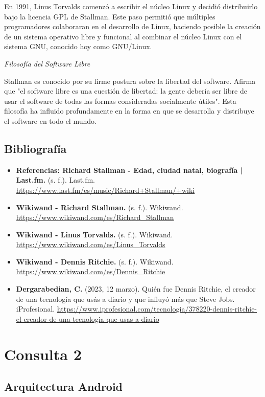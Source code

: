 \documentclass[11pt,twoside]{book}
\begin{document}
En 1991, Linus Torvalds comenzó a escribir el núcleo Linux y decidió distribuirlo bajo la licencia GPL de Stallman. Este paso permitió que múltiples programadores colaboraran en el desarrollo de Linux, haciendo posible la creación de un sistema operativo libre y funcional al combinar el núcleo Linux con el sistema GNU, conocido hoy como GNU/Linux.

\textit{Filosofía del Software Libre}

Stallman es conocido por su firme postura sobre la libertad del software. Afirma que "el software libre es una cuestión de libertad: la gente debería ser libre de usar el software de todas las formas consideradas socialmente útiles". Esta filosofía ha influido profundamente en la forma en que se desarrolla y distribuye el software en todo el mundo.

\subsection*{Bibliografía}
\begin{itemize}
  \item \textbf{Referencias: Richard Stallman - Edad, ciudad natal, biografía | Last.fm.} (s. f.). Last.fm. \url{https://www.last.fm/es/music/Richard+Stallman/+wiki}

  \item \textbf{Wikiwand - Richard Stallman.} (s. f.). Wikiwand. \url{https://www.wikiwand.com/es/Richard_Stallman}

  \item \textbf{Wikiwand - Linus Torvalds.} (s. f.). Wikiwand. \url{https://www.wikiwand.com/es/Linus_Torvalds}

  \item \textbf{Wikiwand - Dennis Ritchie.} (s. f.). Wikiwand. \url{https://www.wikiwand.com/es/Dennis_Ritchie}

  \item \textbf{Dergarabedian, C.} (2023, 12 marzo). Quién fue Dennis Ritchie, el creador de una tecnología que usás a diario y que influyó más que Steve Jobs. iProfesional. \url{https://www.iprofesional.com/tecnologia/378220-dennis-ritchie-el-creador-de-una-tecnologia-que-usas-a-diario}
\end{itemize}
\newpage
\section{Consulta 2}
\subsection{Arquitectura Android}
\end{document}
